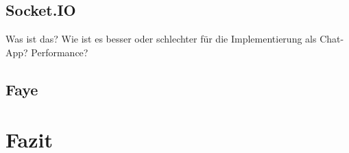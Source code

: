\documentclass[sigplan, screen]{acmart}
\begin{document}
\subsection{Socket.IO}

Was ist das? Wie ist es besser oder schlechter für die Implementierung als Chat-App? Performance?

\subsection{Faye}

\section{Fazit}


% 
% 
% 
% 
% 
\end{document}
